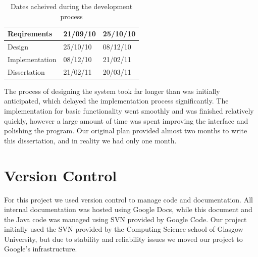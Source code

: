 \begin{table}[!h]
\begin{center}
\caption{Dates acheived during the development process}
\begin{tabular}{ | p{4cm} |p{4cm}  |p{4cm} | }
    \hline
    Reqirements & 21/09/10 & 25/10/10 \\
    \hline
    Design & 25/10/10 & 08/12/10 \\
    \hline
    Implementation & 08/12/10 & 21/02/11 \\
    \hline
    Dissertation & 21/02/11 & 20/03/11 \\
    \hline
\end{tabular}
\end{center}
\end{table}

The process of designing the system took far longer than was initially anticipated, which delayed the implementation process significantly. The implementation for basic functionality went smoothly and was finished relatively quickly, however a large amount of time was spent improving the interface and polishing the program. Our original plan provided almost two months to write this dissertation, and in reality we had only one month.  

\section{Version Control}

For this project we used version control to manage code and documentation. All internal documentation was hosted using Google Docs, while this document and the Java code was managed using SVN provided by Google Code. Our project initially used the SVN provided by the Computing Science school of Glasgow University, but due to stability and reliability issues we moved our project to Google's infrastructure.
